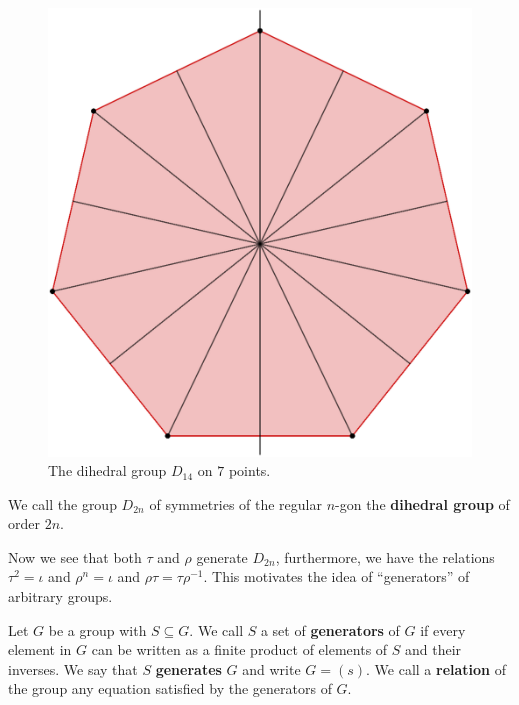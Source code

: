 \begin{figure}
    \centering
    \includegraphics[scale = 0.2]{Figures/Chapter1/D_14.eps}
    \caption{The dihedral group $D_{14}$ on $7$ points.}
    \label{fig_1.1}
\end{figure}

\begin{definition}
    We call the group $D_{2n}$ of symmetries of the regular $n$-gon the \textbf{dihedral group} of
    order $2n$.		
\end{definition}

Now we see that both $\tau$ and  $\rho$ generate  $D_{2n}$, furthermore, we have the relations
$\tau^2=\iota$ and  $\rho^n=\iota$ and  $\rho\tau=\tau\rho^{-1}$. This motivates the idea of
``generators'' of arbitrary groups.

\begin{definition}
    Let $G$ be a group with $S \subseteq G$. We call $S$ a set of \textbf{generators} of $G$ if
    every element in $G$ can be written as a finite product of elements of $S$ and their inverses.
    We say that $S$ \textbf{generates} $G$ and write $G=(s)$. We call a \textbf{relation} of the
    group any equation satisfied by the generators of $G$.
\end{definition}

